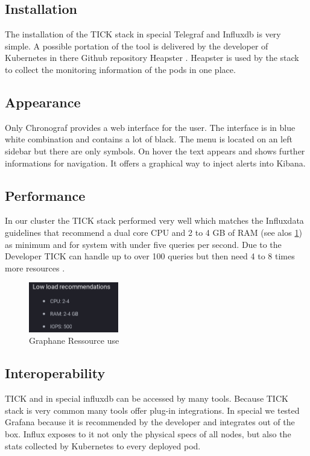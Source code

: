 \subsection{Installation}
The installation of the TICK stack in special Telegraf and Influxdb is very simple. A possible portation of the tool is delivered by the developer of Kubernetes in there Github repository Heapster \cite{heapster}. Heapster is used by the stack to collect the monitoring information of the pods in one place.
\subsection{Appearance}
Only Chronograf provides a web interface for the user. The interface is in blue white combination and contains a lot of black. The menu is located on an left sidebar but there are only symbols. On hover the text appears and shows further informations for navigation. It offers a graphical way to inject alerts into Kibana.

\subsection{Performance}
In our cluster the TICK stack performed very well which matches the Influxdata guidelines that recommend a dual core CPU and 2 to 4 GB of RAM (see alos \cref{fig:TICK_recommendet}) as minimum and for system with under five queries per second. Due to the Developer TICK can handle up to over 100 queries but then need 4 to 8 times more resources \cite{influx_require}.
\begin{figure}
\centering
\includegraphics[width=0.35\textwidth]{Bilder/Performance/TICK_recommendet}
\caption{Graphane Ressource use}
\label{fig:TICK_recommendet}
\end{figure}

\subsection{Interoperability}
TICK and in special influxdb can be accessed by many tools. Because TICK stack is very common many tools offer plug-in integrations. In special we tested Grafana because it is recommended by the developer and integrates out of the box. Influx exposes to it not only the physical specs of all nodes, but also the stats collected by Kubernetes to every deployed pod. 

